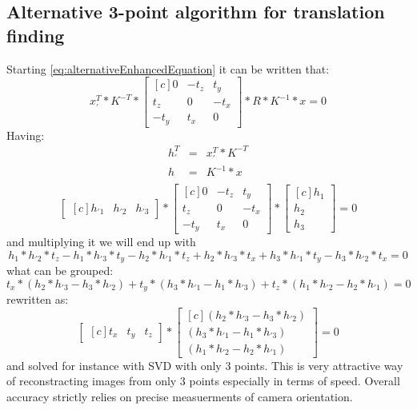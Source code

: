 \subsection{Alternative 3-point algorithm for translation finding}
Starting \ref{eq:alternativeEnhancedEquation} it can be written that:
\begin{equation} \label{eq:alternative3point}
{x}_{'}^{T} * K^{-T} * \begin{bmatrix*}[c]
 0 & -t_{z} & t_{y}\\
 t_{z} & 0 & -t_{x}\\
-t_{y} & t_{x} & 0 
\end{bmatrix*} * R * K^{-1} * x = 0
\end{equation}
Having:
\begin{equation} \label{eq:leftRelative}
\begin{array}{lcl}
h_{'}^{T} &=& {x}_{'}^{T} * K^{-T} \\
h &=& K^{-1} * x \\
\end{array}
\end{equation}
\begin{equation} \label{eq:alternative3point}
\begin{bmatrix*}[c]
h_{'1} & h_{'2} & h_{'3}
\end{bmatrix*}
* \begin{bmatrix*}[c]
 0 & -t_{z} & t_{y}\\
 t_{z} & 0 & -t_{x}\\
-t_{y} & t_{x} & 0 
\end{bmatrix*} 
* \begin{bmatrix*}[c]
h_{1} \\
h_{2} \\
h_{3}
\end{bmatrix*}
= 0
\end{equation}
and multiplying it we will end up with
\begin{equation} \label{eq:alternative3point}
h_{1}*h_{'2}*t_{z} - h_{1}*h_{'3}*t_{y} - h_{2}*h_{'1}*t_{z} + h_{2}*h_{'3}*t_{x} + h_{3}*h_{'1}*t_{y} - h_{3}*h_{'2}*t_{x}
= 0
\end{equation}
what can be grouped:
\begin{equation}
t_{x} * (h_{2}*h_{'3} - h_{3}*h_{'2}) + t_{y} * (h_{3}*h_{'1} - h_{1}*h_{'3}) + t_{z} * (h_{1}*h_{'2} - h_{2}*h_{'1}) = 0
\end{equation}
rewritten as:
\begin{equation} \label{eq:translation3point}
\begin{bmatrix*}[c]
t_{x} &
t_{y} &
t_{z}
\end{bmatrix*} * \begin{bmatrix*}[c]
(h_{2}*h_{'3} - h_{3}*h_{'2}) \\ 
(h_{3}*h_{'1} - h_{1}*h_{'3}) \\
(h_{1}*h_{'2} - h_{2}*h_{'1}) 
\end{bmatrix*} 
= 0
\end{equation}
and solved for instance with SVD with only 3 points. This is very attractive way of reconstracting images from only 3 points especially in terms of speed. Overall accuracy strictly relies on precise measuerments of camera orientation.
